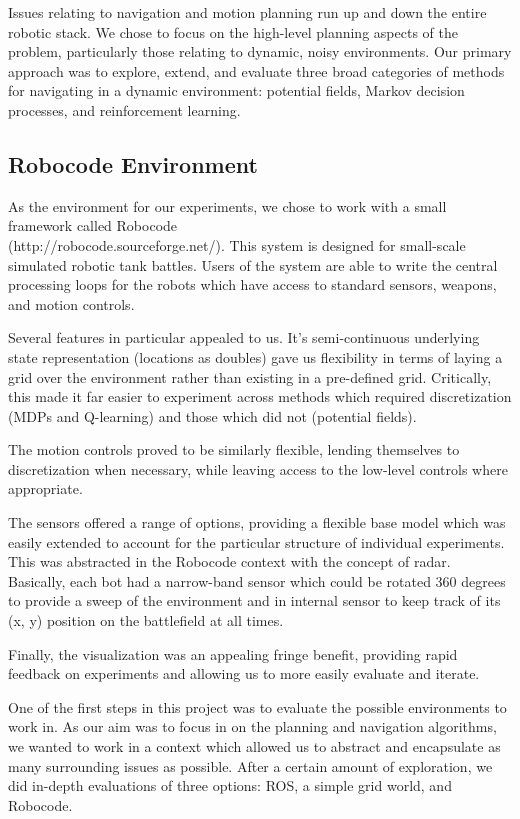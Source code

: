 \documentclass{aiaa-tc}%
\begin{document}
Issues relating to navigation and motion planning run up and down the entire
robotic stack. We chose to focus on the high-level planning aspects of the problem, particularly those relating to dynamic, noisy environments. Our primary approach was to explore, extend, and
evaluate three broad categories of methods for navigating in a dynamic
environment: potential fields, Markov decision processes, and
reinforcement learning.

\subsection{Robocode Environment}

As the environment for our experiments, we chose to work with a small
framework called Robocode \\(http://robocode.sourceforge.net/). This system is designed for small-scale
simulated robotic tank battles. Users of the system are able to write
the central processing loops for the robots which have access to
standard sensors, weapons, and motion controls. 

Several features in particular appealed to us. It's semi-continuous underlying state
representation (locations as doubles) gave us flexibility in
terms of laying a grid over the environment rather than existing in a
pre-defined grid. Critically, this made it far easier to experiment
across methods which required discretization (MDPs and Q-learning) and
those which did not (potential fields).

The motion controls proved to be similarly flexible, lending
themselves to discretization when necessary, while leaving access to
the low-level controls where appropriate.

The sensors offered a range of options, providing a flexible base
model which was easily extended to account for the particular
structure of individual
experiments. This was abstracted in the Robocode context with the
concept of radar. Basically, each bot had a narrow-band sensor which could be rotated 360 degrees to provide a sweep of the environment and in internal sensor to keep track of its (x, y) position on the battlefield at all times.

Finally, the visualization was an appealing fringe benefit, providing
rapid feedback on experiments and allowing us to more easily evaluate
and iterate.

One of the first steps in this project was to evaluate the possible
environments to work in. As our aim was to focus in on the planning and navigation algorithms,
we wanted to work in a context which allowed us to abstract and
encapsulate as many
surrounding issues as possible. After a certain amount of exploration, we did
in-depth evaluations of three options: ROS, a simple grid world, and
Robocode.
\end{document}
